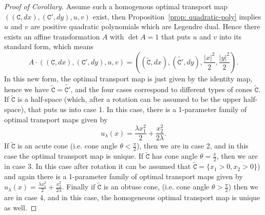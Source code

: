 \documentclass[12pt,reqno]{amsart}
\numberwithin{equation}{section}
\begin{document}
        \begin{proof}[Proof of Corollary]
            
            Assume such a homogenous optimal transport map $((\mathtt C, dx), (\mathtt C', dy), u, v)$ exist, then Proposition~\ref{prop: quadratic-poly} implies $u$ and $v$ are positive quadratic polynomials which are Legendre dual. Hence there exists an affine transformation $A$ with $\det A = 1$ that puts $u$ and $v$ into its standard form, which means
            \[A\cdot ((\mathtt C, dx), (\mathtt C', dy), u, v) = ((\tilde{\mathtt C}, dx), (\tilde{\mathtt C'}, dy), \frac{|x|^2}{2}, \frac{|y|^2}{2}). \]
            In this new form, the optimal transport map is just given by the identity map, hence we have $\tilde{\mathtt C} = \tilde{\mathtt C'}$, and the four cases correspond to different types of cones $\tilde{\mathtt C}$. If $\tilde{\mathtt C}$ is a half-space (which, after a rotation can be assumed to be the upper half-space), that puts us into case 1. In this case, there is a 1-parameter family of optimal transport maps given by
            \[u_{\lambda}(x) = \frac{\lambda x_1^2}{2}+\frac{x_2^2}{2\lambda}. \]
            If $\tilde{\mathtt C}$ is an acute cone (i.e. cone angle $\theta<\frac{\pi}{2}$), then we are in case 2, and in this case the optimal transport map is unique. If $\tilde{\mathtt C}$ has cone angle $\theta = \frac{\pi}{2}$, then we are in case 3. In this case after rotation it can be assumed that $\tilde{\mathtt C} = \{x_1>0, x_2>0\}$) and again there is a 1-parameter family of optimal transport maps given by $u_{\lambda}(x) = \frac{\lambda x_1^2}{2}+\frac{x_2^2}{2\lambda}$. Finally if $\tilde{\mathtt C}$ is an obtuse cone, (i.e. cone angle $\theta>\frac{\pi}{2}$) then we are in case 4, and in this case, the homogeneous optimal transport map is unique as well. 
        \end{proof}
\end{document}
